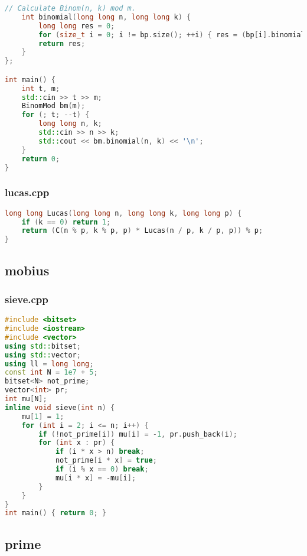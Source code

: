 \documentclass[9pt, a4paper, oneside]{book}
\begin{document}
\begin{lstlisting}[language={C++}]
    // Calculate Binom(n, k) mod m.
    int binomial(long long n, long long k) {
        long long res = 0;
        for (size_t i = 0; i != bp.size(); ++i) { res = (bp[i].binomial(n, k) * crt_m[i] + res) % m; }
        return res;
    }
};

int main() {
    int t, m;
    std::cin >> t >> m;
    BinomMod bm(m);
    for (; t; --t) {
        long long n, k;
        std::cin >> n >> k;
        std::cout << bm.binomial(n, k) << '\n';
    }
    return 0;
}\end{lstlisting}
\subsubsection{lucas.cpp}
\begin{lstlisting}[language={C++}]
long long Lucas(long long n, long long k, long long p) {
    if (k == 0) return 1;
    return (C(n % p, k % p, p) * Lucas(n / p, k / p, p)) % p;
}\end{lstlisting}
\subsection{mobius}
\subsubsection{sieve.cpp}
\begin{lstlisting}[language={C++}]
#include <bitset>
#include <iostream>
#include <vector>
using std::bitset;
using std::vector;
using ll = long long;
const int N = 1e7 + 5;
bitset<N> not_prime;
vector<int> pr;
int mu[N];
inline void sieve(int n) {
    mu[1] = 1;
    for (int i = 2; i <= n; i++) {
        if (!not_prime[i]) mu[i] = -1, pr.push_back(i);
        for (int x : pr) {
            if (i * x > n) break;
            not_prime[i * x] = true;
            if (i % x == 0) break;
            mu[i * x] = -mu[i];
        }
    }
}
int main() { return 0; }\end{lstlisting}
\subsection{prime}
\end{document}
